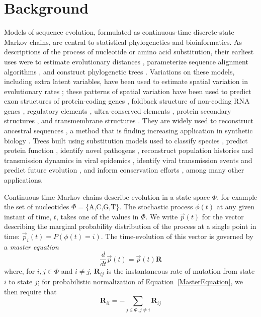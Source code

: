 \documentclass{bmcart}
\newcommand{\matr}[1]{\mathbf{#1}}
\newcommand{\eqref}[1]{Equation~\ref{#1}}
\newcommand{\statespace}{\Phi}
\newcommand{\state}{\phi}
\newcommand{\statevec}{\vec{p}}
\newcommand{\ratematrix}{\matr{R}}
\begin{document}
\section*{Background}

Models of sequence evolution, formulated as continuous-time discrete-state Markov chains,
are central to statistical phylogenetics and bioinformatics.
As descriptions of the process of nucleotide or amino acid substitution,
their earliest uses were to estimate evolutionary distances \cite{JukesCantor69},
parameterize sequence alignment algorithms \cite{DayhoffEtal72},
and construct phylogenetic trees \cite{Felsenstein81}.
Variations on these models, including extra latent variables,
have been used to estimate spatial variation in evolutionary rates \cite{Yang93,Yang94};
these patterns of spatial variation have been used to
predict exon structures of protein-coding genes \cite{PedersenHein2003,SiepelHaussler04b},
foldback structure of non-coding RNA genes \cite{PollardEtAl2006},
regulatory elements \cite{PedersenEtAl04},
ultra-conserved elements \cite{SiepelEtAl2005},
protein secondary structures \cite{GoldmanEtAl96},
and transmembrane structures \cite{LioGoldman99}.
They are widely used to reconstruct ancestral sequences \cite{BlanchetteEtAl2004,UgaldeEtAl2004,Liberles2007,OrtlundEtAl2007,GaucherEtAl2008,AshkenazyEtAl2012,AlcolombriEtAl2011,SantiagoOrtizEtAl2015,ZakasEtAl2016},
a method that is finding increasing application in synthetic biology \cite{Liberles2007,AlcolombriEtAl2011,SantiagoOrtizEtAl2015,ZakasEtAl2016}.
Trees built using substitution models used to classify species \cite{pmid26385966},
predict protein function \cite{EngelhardtEtAl2005},
identify novel pathogens \cite{pmid12690091},
reconstruct population histories \cite{pmid15703244} and transmission dynamics in viral epidemics \cite{pmid22927414},
identify viral transmission events \cite{pmid27783600} and predict future evolution \cite{pmid27774306},
and inform conservation efforts \cite{pmid25561668},
among many other applications.

Continuous-time Markov chains describe evolution in a state space $\statespace$,
for example the set of nucleotides $\statespace = \{ \mbox{A,C,G,T} \}$.
The stochastic process $\state(t)$ at any given instant of time, $t$,
takes one of the values in $\statespace$.
We write $\statevec(t)$ for the vector describing the marginal probability distribution of the process
at a single point in time:
$\statevec_i(t) = P(\state(t) = i)$.
The time-evolution of this vector is governed by a {\em master equation}
\begin{equation}
\frac{d}{dt} \statevec(t) = \statevec(t) \ratematrix
\label{MasterEquation}
\end{equation}
where, for $i,j \in \statespace$ and $i \neq j$,
$\ratematrix_{ij}$ is the instantaneous rate of mutation from state $i$ to state $j$;
for probabilistic normalization of \eqref{MasterEquation},
we then require that
\[
\ratematrix_{ii} = -\sum_{j \in \statespace, j \neq i} \ratematrix_{ij}
\]
\end{document}
